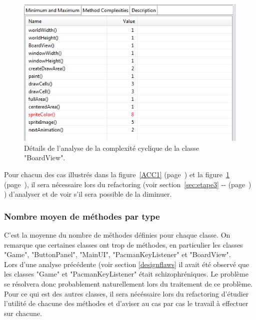 \documentclass[12pt,a4paper,final]{article}
\newcommand{\labelfigure}[1]{figure~\ref{#1} (page~\pageref{#1})}
\newcommand{\refsection}[1]{section~\ref{#1} -\nameref{#1}- (page~\pageref{#1})}
\begin{document}
\begin{figure}[!h]
	\centering
	\includegraphics[width=\textwidth]{ACC_BoardView.png}
	\caption{\label{ACC2}Détails de l'analyse de la complexité cyclique de la classe "BoardView".}
\end{figure}
Pour chacun des cas illustrés dans la \labelfigure{ACC1} et la \labelfigure{ACC2}, il sera nécessaire lors du refactoring (voir \refsection{sec:etape3} ) d'analyser et de voir s'il sera possible de la diminuer.


\subsubsection{Nombre moyen de méthodes par type}
C'est la moyenne du nombre de méthodes définies pour chaque classe.
On remarque que certaines classes ont trop de méthodes, en particulier les classes "Game", "ButtonPanel", "MainUI", "PacmanKeyListener" et "BoardView". \\
Lors d'une analyse précédente (voir section \ref{designflaws} il avait été observé que les classes "Game" et "PacmanKeyListener" était schizophréniques. Le problème se résolvera donc probablement naturellement lors du traitement de ce problème. Pour ce qui est des autres classes, il sera nécéssaire lors du refactoring d'étudier l'utilité de chacune des méthodes et d'aviser au cas par cas le travail à effectuer sur chacune.

\clearpage
\end{document}
